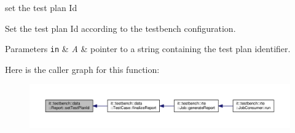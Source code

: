 set the test plan Id 

Set the test plan Id according to the testbench configuration.


\begin{DoxyParams}[1]{Parameters}
\mbox{\tt in}  & {\em A} & pointer to a string containing the test plan identifier. \\
\hline
\end{DoxyParams}


Here is the caller graph for this function\-:
\nopagebreak
\begin{figure}[H]
\begin{center}
\leavevmode
\includegraphics[width=350pt]{d5/de8/classit_1_1testbench_1_1data_1_1Report_aead163e559989efb81d17c227d07f2a5_icgraph}
\end{center}
\end{figure}




